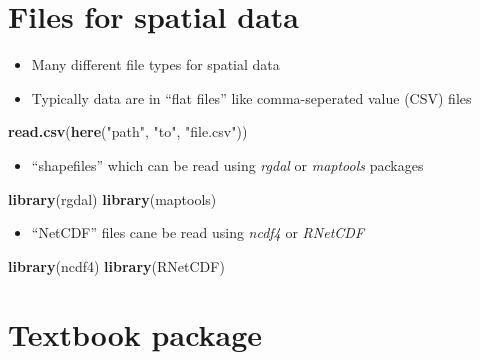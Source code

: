 \documentclass[]{book}
\newenvironment{Shaded}{\begin{snugshade}}{\end{snugshade}}
\newcommand{\KeywordTok}[1]{\textcolor[rgb]{0.13,0.29,0.53}{\textbf{#1}}}
\newcommand{\NormalTok}[1]{#1}
\newcommand{\StringTok}[1]{\textcolor[rgb]{0.31,0.60,0.02}{#1}}
\providecommand{\tightlist}{%
  \setlength{\itemsep}{0pt}\setlength{\parskip}{0pt}}
\begin{document}
\hypertarget{files-for-spatial-data}{%
\section{Files for spatial data}\label{files-for-spatial-data}}

\begin{itemize}
\item
  Many different file types for spatial data
\item
  Typically data are in ``flat files'' like comma-seperated value (CSV) files
\end{itemize}

\begin{Shaded}
\begin{Highlighting}[]
\KeywordTok{read.csv}\NormalTok{(}\KeywordTok{here}\NormalTok{(}\StringTok{"path"}\NormalTok{, }\StringTok{"to"}\NormalTok{, }\StringTok{"file.csv"}\NormalTok{))}
\end{Highlighting}
\end{Shaded}

\begin{itemize}
\tightlist
\item
  ``shapefiles'' which can be read using \emph{rgdal} or \emph{maptools} packages
\end{itemize}

\begin{Shaded}
\begin{Highlighting}[]
\KeywordTok{library}\NormalTok{(rgdal)}
\KeywordTok{library}\NormalTok{(maptools)}
\end{Highlighting}
\end{Shaded}

\begin{itemize}
\tightlist
\item
  ``NetCDF'' files cane be read using \emph{ncdf4} or \emph{RNetCDF}
\end{itemize}

\begin{Shaded}
\begin{Highlighting}[]
\KeywordTok{library}\NormalTok{(ncdf4)}
\KeywordTok{library}\NormalTok{(RNetCDF)}
\end{Highlighting}
\end{Shaded}

\hypertarget{textbook-package}{%
\section{Textbook package}\label{textbook-package}}
\end{document}
